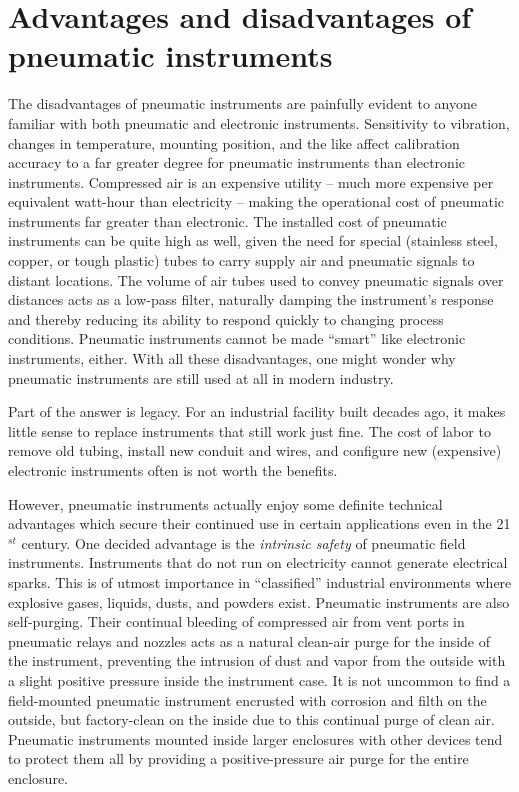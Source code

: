 \filbreak
\section{Advantages and disadvantages of pneumatic instruments} 

The disadvantages of pneumatic instruments are painfully evident to anyone familiar with both pneumatic and electronic instruments.  Sensitivity to vibration, changes in temperature, mounting position, and the like affect calibration accuracy to a far greater degree for pneumatic instruments than electronic instruments.  Compressed air is an expensive utility -- much more expensive per equivalent watt-hour than electricity -- making the operational cost of pneumatic instruments far greater than electronic.  The installed cost of pneumatic instruments can be quite high as well, given the need for special (stainless steel, copper, or tough plastic) tubes to carry supply air and pneumatic signals to distant locations.  The volume of air tubes used to convey pneumatic signals over distances acts as a low-pass filter, naturally damping the instrument's response and thereby reducing its ability to respond quickly to changing process conditions.  Pneumatic instruments cannot be made ``smart'' like electronic instruments, either.  With all these disadvantages, one might wonder why pneumatic instruments are still used at all in modern industry.

Part of the answer is legacy.  For an industrial facility built decades ago, it makes little sense to replace instruments that still work just fine.  The cost of labor to remove old tubing, install new conduit and wires, and configure new (expensive) electronic instruments often is not worth the benefits.

\vskip 10pt

However, pneumatic instruments actually enjoy some definite technical advantages which secure their continued use in certain applications even in the 21$^{st}$ century.  One decided advantage is the \textit{intrinsic safety} of pneumatic field instruments.  Instruments that do not run on electricity cannot generate electrical sparks.  This is of utmost importance in ``classified'' industrial environments where explosive gases, liquids, dusts, and powders exist.  Pneumatic instruments are also self-purging.  Their continual bleeding of compressed air from vent ports in pneumatic relays and nozzles acts as a natural clean-air purge for the inside of the instrument, preventing the intrusion of dust and vapor from the outside with a slight positive pressure inside the instrument case.  It is not uncommon to find a field-mounted pneumatic instrument encrusted with corrosion and filth on the outside, but factory-clean on the inside due to this continual purge of clean air.  Pneumatic instruments mounted inside larger enclosures with other devices tend to protect them all by providing a positive-pressure air purge for the entire enclosure.

